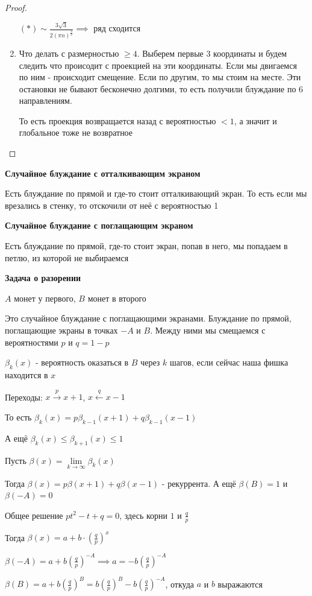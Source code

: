 \begin{proof}
\begin{enumerate}
{            $(*) \sim \frac{3\sqrt{3}}{2 (\pi n)^{\frac{3}{2}}} \implies $ ряд сходится
        }
        \item {
            Что делать с размерностью $\geqslant 4$. Выберем первые 3 координаты и будем следить что происодит с проекцией на эти координаты. 
            Если мы двигаемся по ним - происходит смещение. Если по другим, то мы стоим на месте. Эти остановки не бывают бесконечно долгими, то есть получили блуждание по 6 направлениям.

            То есть проекция возвращается назад с вероятностью $< 1$, а значит и глобальное тоже не возвратное
        }
    \end{enumerate}
\end{proof}

\begin{remark}
    \textbf{Случайное блуждание с отталкивающим экраном}

    Есть блуждание по прямой и где-то стоит отталкивающий экран. То есть если мы врезались в стенку, то отскочили от неё с вероятностью 1
\end{remark}

\begin{remark}
    \textbf{Случайное блуждание с поглащающим экраном}
    
    Есть блуждание по прямой, где-то стоит экран, попав в него, мы попадаем в петлю, из которой не выбираемся
\end{remark}

\begin{example}
    \textbf{Задача о разорении}

    $A$ монет у первого, $B$ монет в второго

    Это случайное блуждание с поглащающими экранами. Блуждание по прямой, поглащающие экраны в точках $-A$ и $B$.
    Между ними мы смещаемся с вероятностями $p$ и $q = 1 - p$

    $\beta_k (x)$ - вероятность оказаться в $B$ через $k$ шагов, если сейчас наша фишка находится в $x$

    Переходы: $x \overset{p}{\rightarrow} x + 1$, $x \overset{q}{\leftarrow} x - 1$

    То есть $\beta_k (x) = p \beta_{k - 1} (x + 1) + q \beta_{k - 1} (x - 1)$

    А ещё $\beta_k (x) \leqslant \beta_{k + 1} (x) \leqslant 1$

    Пусть $\beta (x) = \lim\limits_{k \to \infty} \beta_k (x)$

    Тогда $\beta (x) = p \beta (x + 1) + q \beta (x - 1)$ - рекуррента. А ещё $\beta (B) = 1$ и $\beta (-A) = 0$

    Общее решение $pt^2 - t + q = 0$, здесь корни $1$ и $\frac{q}{p}$

    Тогда $\beta (x) = a + b \cdot \left( \frac{q}{p} \right)^x$
    
    $\beta (-A) = a + b \left( \frac{q}{p} \right)^{-A} \implies a = -b \left( \frac{q}{p}\right)^{-A}$

    $\beta (B) = a + b \left( \frac{q}{p} \right)^B = b \left( \frac{q}{p} \right)^B - b \left( \frac{q}{p} \right)^{-A}$, откуда $a$ и $b$ выражаются
\end{example}

